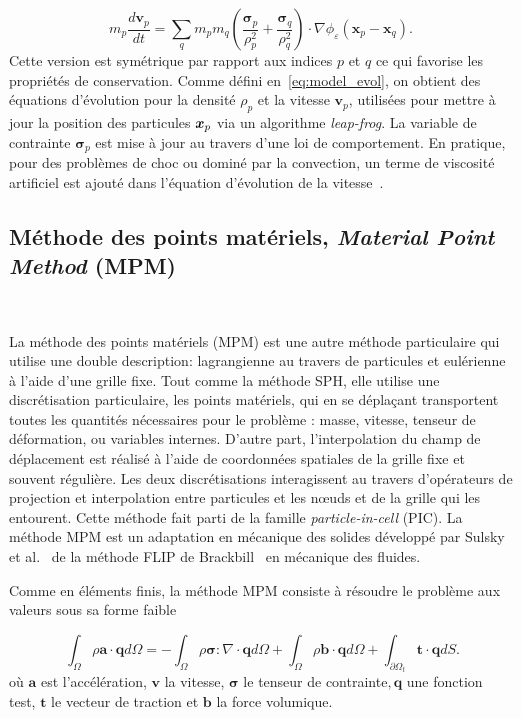 \begin{equation*}
    m_p \frac{d \bm v_p}{dt} = \sum_{q} m_p m_q \left(\frac{\bm \sigma_p}{\rho_p^2} + \frac{\bm \sigma_q}{\rho_q^2} \right) \cdot \nabla \phi_\varepsilon(\bm x_p - \bm x_q).
\end{equation*}Cette version est symétrique par rapport aux indices $p$ et $q$ ce qui favorise les propriétés de conservation.
Comme défini en~\eqref{eq:model_evol}, on obtient des équations d'évolution pour la densité $\rho_p$ et la vitesse $\bm v_p$, utilisées pour mettre à jour la position des particules $\bm{x}_p$ via un algorithme \textit{leap-frog}. La variable de contrainte $\bm \sigma_p$ est mise à jour au travers d'une loi de comportement. En pratique, pour des problèmes de choc ou dominé par la convection, un terme de viscosité artificiel est ajouté dans l'équation d'évolution de la vitesse~\cite{MONAGHAN1983374}.

\subsection{Méthode des points matériels, \textit{Material Point Method} (MPM)}~\label{sec:mpm}

La méthode des points matériels (MPM) est une autre méthode particulaire qui utilise une double description: lagrangienne au travers de particules et eulérienne à l'aide d'une grille fixe. Tout comme la méthode SPH, elle utilise une discrétisation particulaire, les points matériels, qui en se déplaçant transportent toutes les quantités nécessaires pour le problème : masse, vitesse, tenseur de déformation, ou variables internes. D'autre part, l'interpolation du champ de déplacement est réalisé à l'aide de coordonnées spatiales de la grille fixe et souvent régulière. Les deux discrétisations interagissent au travers d'opérateurs de projection et interpolation entre particules et les nœuds et de la grille qui les entourent. Cette méthode fait parti de la famille \textit{particle-in-cell} (PIC). La méthode MPM est un adaptation en mécanique des solides développé par Sulsky et al.~\cite{sulsky_particle_1994} de la méthode FLIP de Brackbill~\cite{brackbill_flip_1988} en mécanique des fluides.

Comme en éléments finis, la méthode MPM consiste à résoudre le problème aux valeurs sous sa forme faible

\begin{equation*}~\label{eq:form_faible}
    \int_\Omega \rho \bm a \cdot \bm q d\Omega = - \int_\Omega \rho \bm \sigma : \nabla \cdot \bm q d\Omega + \int_\Omega \rho \bm b\cdot \bm q d\Omega + \int_{\partial \Omega_t}  \bm t \cdot \bm q dS.
\end{equation*}où $\bm a$ est l'accélération, $\bm v$ la vitesse, $\bm \sigma$ le tenseur de contrainte$, \bm q$ une fonction test, $\bm t$ le vecteur de traction et $\bm b$ la force volumique.


